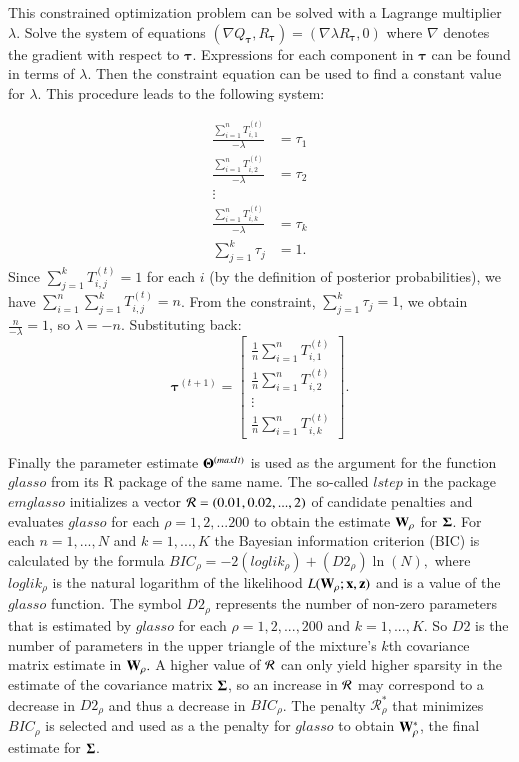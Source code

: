 \documentclass[10pt]{amsart}
\newcommand{\Rho}{\mathcal{R}}
\begin{document}
This constrained optimization problem can be solved with a Lagrange multiplier $\lambda$. Solve the system of equations $(\nabla Q_{\boldsymbol{\tau}},R_{\boldsymbol{\tau}})=(\nabla \lambda R_{\boldsymbol{\tau}},0)$ where $\nabla$ denotes the gradient with respect to $\boldsymbol{\tau}$. Expressions for each component in $\boldsymbol{\tau}$ can be found in terms of $\lambda$. Then the constraint equation can be used to find a constant value for $\lambda.$ This procedure leads to the following system:

\[
\begin{split}
    \frac{\sum_{i=1}^n T_{i,1}^{(t)}}{-\lambda}&= \tau_{1}\\
    \frac{\sum_{i=1}^n T_{i,2}^{(t)}}{-\lambda}&= \tau_{2}\\
    \vdots \\
    \frac{\sum_{i=1}^n T_{i,k}^{(t)}}{-\lambda}&= \tau_{k}\\
    \sum_{j=1}^k \tau_j&=1.
\end{split}
\]
Since $\sum_{j=1}^kT_{i,j}^{(t)}=1$ for each $i$ (by the definition of posterior probabilities), we have $\sum_{i=1}^n\sum_{j=1}^k T_{i,j}^{(t)} = n$. From the constraint, $\sum_{j=1}^k \tau_j = 1$, we obtain $\frac{n}{-\lambda}=1$, so $\lambda=-n$. Substituting back:
\[
\boldsymbol{\tau}^{(t+1)}=\begin{bmatrix}
\frac{1}{n}\sum_{i=1}^nT_{i,1}^{(t)} \\ \frac{1}{n}\sum_{i=1}^nT_{i,2}^{(t)} \\ \vdots \\ \frac{1}{n}\sum_{i=1}^nT_{i,k}^{(t)}\end{bmatrix}.
\]



Finally the parameter estimate ${\bf \Theta}^{(maxIt)}$ is used as the argument for the function $glasso$ from its R package of the same name. The so-called $lstep$ in the package $emglasso$ initializes a vector ${\bf \Rho}=(0.01,0.02,...,2)$ of candidate penalties and evaluates $glasso$ for each $\rho=1,2,...200$ to obtain the estimate ${\bf W}_{\rho}$ for ${\bf \Sigma}$. For each $n=1,...,N$ and $k=1,...,K$ the Bayesian information criterion (BIC) is calculated by the formula $BIC_{\rho}=-2(loglik_{\rho})+(D2_{\rho})\ln(N),$ where $loglik_{\rho}$ is the natural logarithm of the likelihood $L({\bf W}_{\rho};{\bf x},{\bf z})$ and is a value of the $glasso$ function. The symbol $D2_{\rho}$ represents the number of non-zero parameters that is estimated by $glasso$ for each $\rho=1,2,...,200$ and $k=1,...,K.$ So $D2$ is the number of parameters in the upper triangle of the mixture's $k$th covariance matrix estimate in ${\bf W}_{\rho}.$ A higher value of ${\bf \Rho}$ can only yield higher sparsity in the estimate of the covariance matrix ${\bf \Sigma}$, so an increase in ${\bf \Rho}$ may correspond to a decrease in $D2_{\rho}$ and thus a decrease in $BIC_{\rho}$. The penalty $\Rho_{\rho}^*$ that minimizes $BIC_{\rho}$ is selected and used as a the penalty for $glasso$ to obtain ${\bf W}_{\rho}^*$, the final estimate for ${\bf \Sigma}$. 
\end{document}
